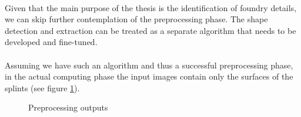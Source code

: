 \paragraph{}
Given that the main purpose of the thesis is the identification of foundry details, we can skip further contemplation of the preprocessing phase. The shape detection and extraction can be treated as a separate algorithm that needs to be developed and fine-tuned.
\paragraph{}
Assuming we have such an algorithm and thus a successful preprocessing phase, in the actual computing phase the input images contain only the surfaces of the splints (see figure \ref{fig:preprocessing_outputs}).

\begin{figure}[H]
     \centering
     \qquad
     \qquad
     \vfill
     \qquad
     \caption{Preprocessing outputs}
     \label{fig:preprocessing_outputs}
\end{figure}

